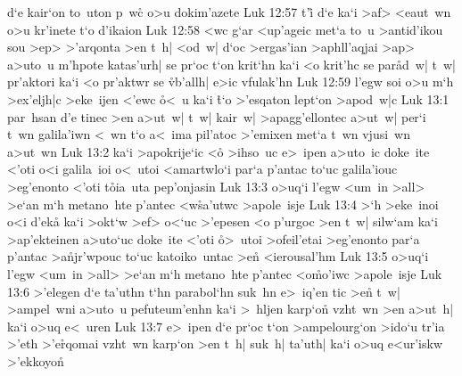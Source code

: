 d`e
kair`on
to~uton
p~wc\r{}
o>u
dokim'azete\bibvsend
\vs Luk 12:57
t'i\r{}
d`e
ka`i
>af>
<eaut~wn
o>u
kr'inete
t`o
d'ikaion\bibvsend
\vs Luk 12:58
<wc
g`ar
<up'ageic
met`a
to~u
>antid'ikou
sou
>ep>
>'arqonta
>en
t~h|
<od~w|
d`oc
>ergas'ian
>aphll'aqjai
>ap>
a>uto~u
m'hpote
katas'urh|
se
pr`oc
t`on
krit`hn
ka`i
<o
krit'hc
se
par\r{a}d~w|
t~w|
pr'aktori
ka`i
<o
pr'aktwr
se
\r{vb}'allh|
e>ic
vfulak'hn\bibvsend
\vs Luk 12:59
l'egw
soi
o>u
m`h
>ex'eljh|c
>eke~ijen
<'ewc
\r{o}<~u
ka`i
\r{t}`o
>'esqaton
lept`on
>apod~w|c\bibvsend
\vs Luk 13:1
par~hsan
d'e
tinec
>en
a>ut~w|
t~w|
kair~w|
>apagg'ellontec
a>ut~w|
per`i
t~wn
galila'iwn
<~wn
t`o
a<~ima
pil'atoc
>'emixen
met`a
t~wn
vjusi~wn
a>ut~wn\bibvsend
\vs Luk 13:2
ka`i
>apokrije`ic
<o\r{}
>ihso~uc
e>~ipen
a>uto~ic
doke~ite
<'oti
o<i
galila~ioi
o<~utoi
<amartwlo`i
par`a
p'antac
to`uc
galila'iouc
>eg'enonto
<'oti
t\r{o}ia~uta
pep'onjasin\bibvsend
\vs Luk 13:3
o>uq`i
l'egw
<um~in
>all>
>e`an
m`h
metano~hte
p'antec
<w\r{s}a'utwc
>apole~isje\bibvsend
\vs Luk 13:4
>`h
>eke~inoi
o<i
d'eka\r{}
ka`i
>okt`w
>ef>
o<`uc
>'epesen
<o
p'urgoc
>en
t~w|
silw`am
ka`i
>ap'ekteinen
a>uto`uc
doke~ite
<'oti
\r{o}>~utoi
>ofeil'etai
>eg'enonto
par`a
p'antac
>a\r{n}jr'wpouc
to`uc
katoiko~untac
>e\r{n}
<ierousal'hm\bibvsend
\vs Luk 13:5
o>uq`i
l'egw
<um~in
>all>
>e`an
m`h
metano~hte
p'antec
<o\r{m}o'iwc
>apole~isje\bibvsend
\vs Luk 13:6
>'elegen
d`e
ta'uthn
t`hn
parabol`hn
suk~hn
e>~iq'en
tic
>en\r{}
t~w|
>ampel~wni
a>uto~u
pefuteum'enhn
ka`i
>~hljen
karp`on\r{}
vzht~wn
>en
a>ut~h|
ka`i
o>uq
e<~uren\bibvsend
\vs Luk 13:7
e>~ipen
d`e
pr`oc
t`on
>ampelourg`on
>ido`u
tr'ia
>'eth
>'e\r{r}qomai
vzht~wn
karp`on
>en
t~h|
suk~h|
ta'uth|
ka`i
o>uq
e<ur'iskw
>'ekkoyo\r{n}
